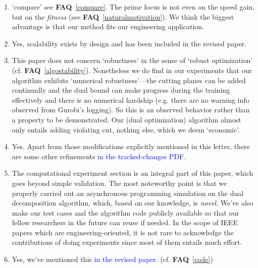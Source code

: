 \documentclass[11pt]{article}
\newcommand{\faq}[1]{\textbf{FAQ}~\ref{#1}}
\newcommand{\blue}[1]{\textcolor{blue}{#1}}
\begin{document}
\begin{enumerate}
    \item \label{fitness} `compare' see \faq{compare}. The prime focus is not even on the speed gain, but on the \textit{fitness} (see \faq{naturalmotivation}).
    We think the biggest advantage is that our method fits our engineering application.
    \item Yes, scalability exists by design and has been included in the revised paper.
    \item \label{R1robust} This paper does not concern `robustness' in the sense of `robust optimization' (cf. \faq{algostability}).
    Nonetheless we do find in our experiments that our algorithm exhibits `numerical robustness'---the cutting
    planes can be added continually and the dual bound can make progress during the training effectively and there is
    no numerical hardship (e.g. there are no warning info observed from Gurobi's logging).
    So this is an observed behavior rather than a property to be demonstrated.
    Our (dual optimization) algorithm almost only entails adding violating cut, nothing else, which we deem `economic'.
    \item Yes. Apart from those modifications explicitly mentioned in this letter, there are some other refinements \blue{in the tracked-changes PDF}.
    \item The computational experiment section is an integral part of this paper, which goes beyond simple validation. The most noteworthy point is that we properly carried out an asynchronous programming simulation on the dual decomposition algorithm, which, based on our knowledge, is \textit{novel}. We've also make our test cases and the algorithm code publicly available so that our fellow researchers in the future can reuse if needed.
    In the scope of IEEE papers which are engineering-oriented, it is not rare to acknowledge the contributions of doing experiments since most of them entails much effort.
    \item Yes, we've mentioned this \blue{in the revised paper}. (cf. \faq{code})
\end{enumerate}
\end{document}
